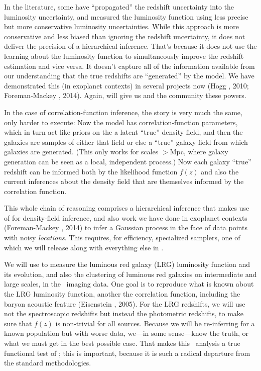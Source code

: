\documentclass[12pt]{article}
\begin{document}
In the literature, some have ``propagated'' the redshift uncertainty
into the luminosity uncertainty, and measured the luminosity function
using less precise but more conservative luminosity uncertainties.
While this approach is more conservative and less biased than ignoring
the redshift uncertainty, it does not deliver the precision of a
hierarchical inference.
That's because it does not use the learning about the luminosity
function to simultaneously improve the redshift estimation and vice
versa.
It doesn't capture all of the information available from our understanding
that the true redshifts are ``generated'' by the model.
We have demonstrated this (in exoplanet contexts) in several projects
now (Hogg \etal, 2010; Foreman-Mackey \etal, 2014).
Again,  will give us and the community these powers.

In the case of correlation-function inference, the story is very much
the same, only harder to execute:
Now the model has correlation-function parameters, which in turn act
like priors on the a latent ``true'' density field, and then the
galaxies are samples of either that field or else a ``true'' galaxy
field from which galaxies are generated.
(This only works for scales $>$Mpc, where galaxy generation can be
seen as a local, independent process.)
Now each galaxy ``true'' redshift can be informed both by the likelihood
function $f(z)$ and also the current inferences about the density field
that are themselves informed by the correlation function.

This whole chain of reasoning comprises a hierarchical inference that
makes use of  for density-field inference, and
also work we have done in exoplanet contexts (Foreman-Mackey \etal, 2014) to infer a
Gaussian process in the face of data points with noisy \emph{locations}.
This requires, for efficiency, specialized samplers, one
of which we will release along with everything else in
.

We will use  to measure the luminous red galaxy
(LRG) luminosity function and its evolution, and also the clustering
of luminous red galaxies on intermediate and large scales, in the
\sdss\ imaging data.
One goal is to reproduce what is known about the LRG luminosity
function, another the correlation function, including the baryon
acoustic feature (Eisenstein \etal, 2005).
For the LRG redshifts, we will use not the spectroscopic redshifts but
instead the photometric redshifts, to make sure that $f(z)$ is
non-trivial for all sources.
Because we will be re-inferring for a known population but with worse
data, we---in some sense---know the truth, or what we must get in the
best possible case.
That makes this \sdss\ analysis a true functional test of
; this is important, because it is such a radical
departure from the standard methodologies.
\end{document}
